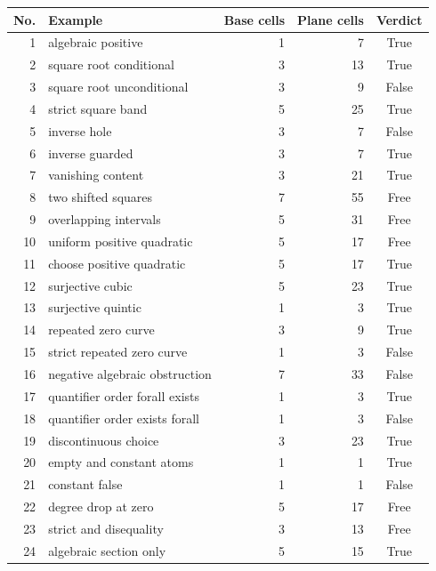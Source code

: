 \small
\begin{longtable}{r p{}r r c}
\toprule
No. & Example & Base cells & Plane cells & Verdict\\
\midrule\endhead
1 & algebraic positive & 1 & 7 & True\\
2 & square root conditional & 3 & 13 & True\\
3 & square root unconditional & 3 & 9 & False\\
4 & strict square band & 5 & 25 & True\\
5 & inverse hole & 3 & 7 & False\\
6 & inverse guarded & 3 & 7 & True\\
7 & vanishing content & 3 & 21 & True\\
8 & two shifted squares & 7 & 55 & Free\\
9 & overlapping intervals & 5 & 31 & Free\\
10 & uniform positive quadratic & 5 & 17 & Free\\
11 & choose positive quadratic & 5 & 17 & True\\
12 & surjective cubic & 5 & 23 & True\\
13 & surjective quintic & 1 & 3 & True\\
14 & repeated zero curve & 3 & 9 & True\\
15 & strict repeated zero curve & 1 & 3 & False\\
16 & negative algebraic obstruction & 7 & 33 & False\\
17 & quantifier order forall exists & 1 & 3 & True\\
18 & quantifier order exists forall & 1 & 3 & False\\
19 & discontinuous choice & 3 & 23 & True\\
20 & empty and constant atoms & 1 & 1 & True\\
21 & constant false & 1 & 1 & False\\
22 & degree drop at zero & 5 & 17 & Free\\
23 & strict and disequality & 3 & 13 & Free\\
24 & algebraic section only & 5 & 15 & True\\
\bottomrule
\end{longtable}
\normalsize
